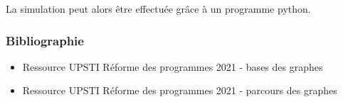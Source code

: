 \begin{frame}[fragile]
\vspace{-0.2cm}
La simulation peut alors être effectuée grâce à un programme python.
\end{frame}

\begin{frame}[fragile]
\frametitle{Bibliographie}
\begin{itemize}
\item Ressource UPSTI Réforme des programmes 2021 - bases des graphes
\item Ressource UPSTI Réforme des programmes 2021 - parcours des graphes
\end{itemize}

\end{frame}



